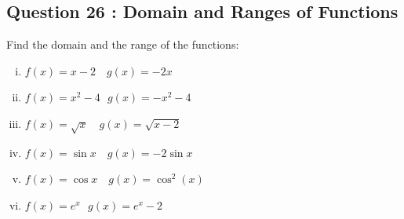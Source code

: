 \documentclass[]{article}
\begin{document}
\subsection*{Question 26 : Domain and Ranges of Functions}
Find the domain and the range of the functions:
\begin{multicols}{2}
	\begin{enumerate}[(i)]
		\item $f( x )= x - 2$ \,\, $g( x )= -2 x$
		
		\item $f( x )= x^2 - 4$\,\, $g( x )= - x^2 - 4$
		
		
		
		\item $f( x )= \sqrt{x}$ \,\, $g( x )= \sqrt{x - 2}$
		
		
		
		\item $f( x ) =  \sin x$ \,\, $g( x ) =  -2 \sin x$
		
		\item $f( x ) =  \cos x$ \,\, $g( x ) =  \cos^2(x)$
		
		\item $f( x ) =  e^{x}$\,\, $g( x) =  e^{x}- 2$
		
		
		
	\end{enumerate}
\end{multicols}		\smallskip
\end{document}
